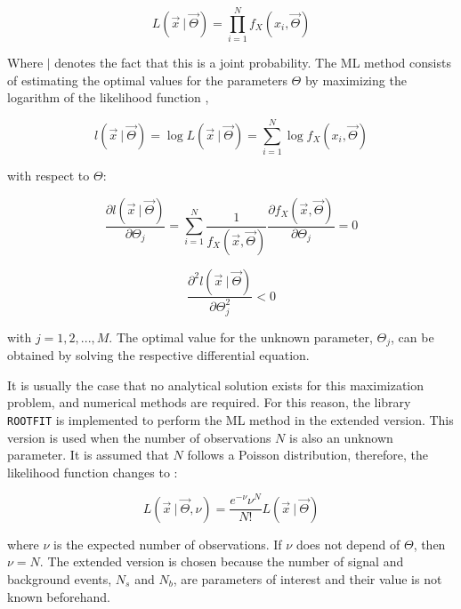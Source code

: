\begin{equation}
L(\vec{x} \ | \ \vec{\Theta}) = \prod_{i = 1}^{N} f_X(x_i, \vec{\Theta}) 
\end{equation}

Where $|$ denotes the fact that this is a joint probability. The ML method consists of estimating the optimal values for the parameters $\Theta$ by maximizing the logarithm of the likelihood function \cite{mejia2012medida},

\begin{equation}
	l(\vec{x} \ | \ \vec{\Theta}) = \log L(\vec{x} \ | \ \vec{\Theta}) = \sum_{i = 1}^{N} \log f_X(x_i, \vec{\Theta})
\end{equation} 

with respect to $\Theta$:

\begin{equation}
	\frac{\partial{l(\vec{x} \ | \ \vec{\Theta})}}{\partial \Theta_j} = \sum_{i = 1}^{N} \frac{1}{f_X(\vec{x}, \vec{\Theta})} \frac{\partial{f_X(\vec{x}, \vec{\Theta})}}{\partial \Theta_j} = 0
\end{equation} 

\begin{equation}
	\frac{\partial^2{l(\vec{x} \ | \ \vec{\Theta})}}{\partial \Theta_j ^2} < 0
	\label{eq:ml}
\end{equation}

with $ j = 1, 2, ..., M$. The optimal value for the unknown parameter, $\Theta_j$, can be obtained by solving the respective differential equation.

It is usually the case that no analytical solution exists for this maximization problem, and numerical methods are required. For this reason, the library \verb|ROOTFIT| is implemented to perform the ML method in the extended version. This version is used when the number of observations $N$ is also an unknown parameter. It is assumed that $N$ follows a Poisson distribution, therefore, the likelihood function changes to \cite{bonanomi2021response}:

\begin{equation}
	L(\vec{x} \ | \ \vec{\Theta}, \nu) = \frac{e^{-\nu} \nu^N}{N!} L(\vec{x} \ | \ \vec{\Theta})
\end{equation}

where $\nu$ is the expected number of observations. 
If $\nu$ does not depend of $\Theta$, then $\nu = N$. The extended version is chosen because the number of signal and background events, $N_s$ and $N_b$, are parameters of interest and their value is not known beforehand. 
